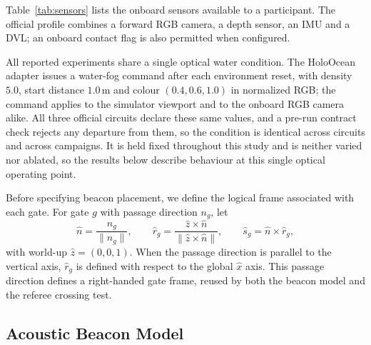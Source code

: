 Table~\ref{tab:sensors} lists the onboard sensors available to a participant.
The official profile combines a forward RGB camera, a depth sensor, an IMU and a
DVL; an onboard contact flag is also permitted when configured.



All reported experiments share a single optical water condition. The HoloOcean
adapter issues a water-fog command after each environment reset, with density
$5.0$, start distance $1.0$\,m and colour $(0.4,0.6,1.0)$ in normalized RGB;
the command applies to the simulator viewport and to the onboard RGB camera
alike. All three official circuits declare these same values, and a pre-run
contract check rejects any departure from them, so the condition is identical
across circuits and across campaigns. It is held fixed throughout this study and
is neither varied nor ablated, so the results below describe behaviour at this
single optical operating point.

Before specifying beacon placement, we define the logical frame associated with
each gate. For gate $g$ with passage direction $n_g$, let
\begin{equation}
\label{eq:gate_frame}
\hat{n}=\frac{n_g}{\lVert n_g\rVert},\qquad
\hat{r}_g=
\frac{\hat{z}\times\hat{n}}
{\lVert\hat{z}\times\hat{n}\rVert},\qquad
\hat{s}_g=\hat{n}\times\hat{r}_g,
\end{equation}
with world-up $\hat{z}=(0,0,1)$. When the passage direction is parallel to the
vertical axis, $\hat{r}_g$ is defined with respect to the global $\hat{x}$ axis.
This passage direction defines a right-handed gate frame, reused by both the
beacon model and the referee crossing test.

\subsection{Acoustic Beacon Model}

